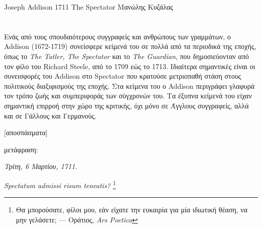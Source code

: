 \translationsetup
    {Joseph Addison}
    {1711}
    {The Spectator}
    {Μανώλης Κυζάλας}

\pagestyle{texts}
\chapter[%
    \originalauthor\ -- \emph{\translatedtitle}\ \yearpublished\\%
    {\normalfont \emph{μετάφραση:} \maintranslator}%
]{\originalauthor}

\begin{preface}
    Ενάς από τους σπουδαιότερους συγγραφείς και ανθρώπους των γραμμάτων, ο Addison (1672-1719) συνείσφερε κείμενά του σε πολλά από τα περιοδικά της εποχής, όπως το \emph{The Tatler, The Spectator} και το \emph{The Guardian}, που δημοσιεύονταν από τον φίλο του Richard Steele, από το 1709 εώς το 1713. Ιδιαίτερα σημαντικές είναι οι συνεισφορές του Addison στο Spectator που κρατούσε μετριοπαθή στάση στους πολιτικούς διαξιφισμούς της εποχής. Στα κείμενα του ο Addison περιγράφει γλαφυρά τον τρόπο ζωής και συμπεριφοράς των σύγχρονών του. Τα έξυπνα κείμενά του είχαν σημαντική επιρροή στην χώρο της κριτικής, όχι μόνο σε Άγγλους συγγραφείς, αλλά και σε Γάλλους και Γερμανούς.
\end{preface}

\begin{center}
    \textbf{\translatedtitle}

    [αποσπάσματα]

    μετάφραση: \maintranslator
\end{center}

\begin{center}
    \emph{Τρίτη, 6 Μαρτίου, 1711.}

    \emph{Spectatum admissi risum teneatis?}%
    \footnote{Θα μπορούσατε, φίλοι μου, εάν είχατε την ευκαιρία για μία ιδιωτική θέαση, να μην γελάσετε; --- Οράτιος, \emph{Ars Poetica}}
\end{center}

